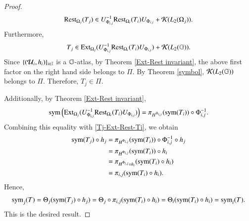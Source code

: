\documentclass[leqno]{amsart}
\begin{document}
\begin{proof}
		\begin{align*}
			{\rm Rest}_{\Omega_{j}}(T_{j})\in U_{\Phi_{i,j}}^{-1} {\rm Rest}_{\Omega_{i}}(T_{i})U_{\Phi_{i,j}}+{\mathcal K}(L_{2}(\Omega_{j})).
		\end{align*}
		Furthermore,
		\begin{align}\label{Tj-Ext-Rest-Ti}
			T_{j}\in {\rm Ext}_{\Omega_{j}}(U_{\Phi_{i,j}}^{-1} {\rm Rest}_{\Omega_{i}}(T_{i})U_{\Phi_{i,j}})+{\mathcal K}(L_{2}(\mathbb{G})).
		\end{align}
		Since $\{({\mathcal U}_{i},h_{i})\}_{i\in\mathbb I}$ is a $\mathbb{G}$-atlas, by Theorem \ref{Ext-Rest invariant}, the above first factor on the right hand side belongs to $\Pi$. By Theorem \ref{symbol}, ${\mathcal K}(L_{2}(\mathbb{G}))$ belongs to $\Pi$. Therefore, $T_{j}\in\Pi$.
		
		Additionally, by Theorem \ref{Ext-Rest invariant},
		\begin{align*}
			{\rm sym}\left({\rm Ext}_{\Omega_{j}}(U_{\Phi_{i,j}}^{-1} {\rm Rest}_{\Omega_{i}}(T_{i})U_{\Phi_{i,j}})\right)
			=\pi_{H^{\Phi_{i,j}}}({\rm sym}(T_{i}))\circ\Phi_{i,j}^{-1}.
		\end{align*}
		Combining this equality with \eqref{Tj-Ext-Rest-Ti}, we obtain
		\begin{align*}
			{\rm sym}(T_{j})\circ h_{j}
			&=\pi_{H^{\Phi_{i,j}}}({\rm sym}(T_{i}))\circ\Phi_{i,j}^{-1}\circ h_{j}\\
			&=\pi_{H^{\Phi_{i,j}}}({\rm sym}(T_{i}))\circ h_{i}\\
			&=\pi_{H^{\Phi_{i,j}}\circ h_{i}}({\rm sym}(T_{i})\circ h_{i})\\
			&=\pi_{i,j}({\rm sym}(T_{i})\circ h_{i}).
		\end{align*}
		Hence,
		\begin{align*}
			{\rm sym}_{j}(T)=\Theta_{j}({\rm sym}(T_{j})\circ h_{j})
			=\Theta_{j}\circ\pi_{i,j}({\rm sym}(T_{i})\circ h_{i})
			=\Theta_{i}({\rm sym}(T_{i})\circ h_{i})={\rm sym}_{i}(T).
		\end{align*}
		This is the desired result.
	\end{proof}
	
	
	
\end{document}
